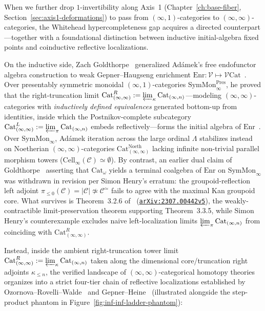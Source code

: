 When we further drop $1$-invertibility along Axis~1 (Chapter~\ref{ch:base-fiber}, Section~\ref{sec:axis1-deformations}) to pass from $(\infty, 1)$-categories to $(\infty, \infty)$-categories, the Whitehead hypercompleteness gap acquires a directed counterpart---together with a foundational distinction between inductive initial-algebra fixed points and coinductive reflective localizations.

On the inductive side, Zach Goldthorpe~\cite{Goldthorpe23} generalized Ad\'amek's free endofunctor algebra construction to weak Gepner--Haugseng enrichment $\mathrm{Enr}: \mathcal{V} \mapsto \mathcal{V}\mathrm{Cat}$~\cite{GepnerHaugseng15}. Over presentably symmetric monoidal $(\infty, 1)$-categories $\mathrm{SymMon}^{\mathrm{Pres}}_\infty$, he proved that the right-truncation limit $\mathrm{Cat}^R_{(\infty, \infty)} := \varprojlim_\kappa \mathrm{Cat}_{(\infty, n)}$---modeling $(\infty, \infty)$-categories with \emph{inductively defined equivalences} generated bottom-up from identities, inside which the Postnikov-complete subcategory $\mathrm{Cat}^L_{(\infty, \infty)} := \varprojlim_\pi \mathrm{Cat}_{(\infty, n)}$ embeds reflectively---forms the initial algebra of $\mathrm{Enr}$~\cite[Theorem~3.3.5]{Goldthorpe23}. Over $\mathrm{SymMon}_\infty$, Ad\'amek iteration across the large ordinal $\Lambda$ stabilizes instead on Noetherian $(\infty, \infty)$-categories $\mathrm{Cat}^{\mathrm{Noeth}}_{(\infty, \infty)}$ lacking infinite non-trivial parallel morphism towers ($\mathrm{Cell}_\infty(\mathcal{C}) \simeq \emptyset$). By contrast, an earlier dual claim of Goldthorpe~\cite{Goldthorpe23} asserting that $\mathrm{Cat}_\omega$ yields a terminal coalgebra of $\mathrm{Enr}$ on $\mathrm{SymMon}_\infty$ was withdrawn in revision per Simon Henry's erratum: the groupoid-reflection left adjoint $\pi_{\le 0}(\mathcal{C}) = |\mathcal{C}| \not\simeq \mathcal{C}^{\simeq}$ fails to agree with the maximal Kan groupoid core. What survives is Theorem~3.2.6 of~\cite{Goldthorpe23} (\href{https://arxiv.org/abs/2307.00442v5}{\texttt{arXiv:2307.00442v5}}), the weakly-contractible limit-preservation theorem supporting Theorem~3.3.5, while Simon Henry's counterexample excludes naive left-localization limits $\varprojlim_\pi \mathrm{Cat}_{(\infty, n)}$ from coinciding with $\mathrm{Cat}^R_{(\infty, \infty)}$.

Instead, inside the ambient right-truncation tower limit $\mathrm{Cat}^R_{(\infty, \infty)} := \varprojlim_\kappa \mathrm{Cat}_{(\infty, n)}$ taken along the dimensional core/truncation right adjoints $\kappa_{\le n}$, the verified landscape of $(\infty, \infty)$-categorical homotopy theories organizes into a strict four-tier chain of reflective localizations established by Ozornova--Rovelli--Walde~\cite[Thm.~4.25, \S 5]{ORW26} and Gepner--Heine~\cite{GepnerHeine26} (illustrated alongside the step-product phantom in Figure~\ref{fig:inf-inf-ladder-phantom}):

